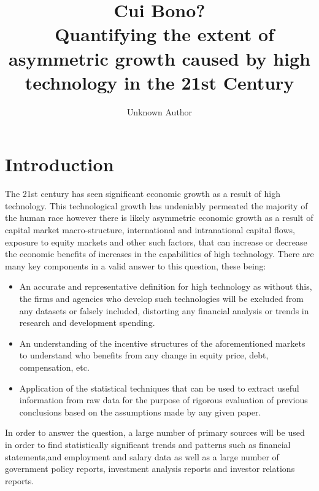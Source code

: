 \documentclass{article}
\title{%
  \textbf{Cui Bono?} \\
  \ Quantifying the extent of asymmetric growth caused by high technology in the 21st Century\\
    }
\author{Unknown Author}
\begin{document}
\maketitle

\section{Introduction}
The 21st century has seen significant economic growth as a result of high technology. This technological growth has undeniably permeated the majority of the human race however there is likely asymmetric economic growth as a result of capital market macro-structure, international and intranational capital flows, exposure to equity markets and other such factors, that can increase or decrease the economic benefits of increases in the capabilities of high technology.
There are many key components in a valid answer to this question, these being:
\begin{itemize}
    \item An accurate and representative definition for high technology as without this, the firms and agencies who develop such technologies will be excluded from any datasets or falsely included, distorting any financial analysis or trends in research and development spending.
    \item An understanding of the incentive structures of the aforementioned markets to understand who benefits from any change in equity price, debt, compensation, etc.
    \item Application of the statistical techniques that can be used to extract useful information from raw data for the purpose of rigorous evaluation of previous conclusions based on the assumptions made by any given paper.
\end{itemize}
In order to answer the question, a large number of primary sources will be used in order to find statistically significant trends and patterns such as financial statements,and employment and salary data as well as a large number of government policy reports, investment analysis reports and investor relations reports.
\end{document}
